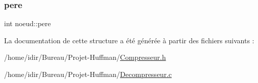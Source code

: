 \mbox{\label{structnoeud_abaa508f22b6e8abe012cd536e7bb8780}} 
\subsubsection{\texorpdfstring{pere}{pere}}
{\footnotesize\ttfamily int noeud\+::pere}



La documentation de cette structure a été générée à partir des fichiers suivants \+:\begin{DoxyCompactItemize}
\item 
/home/idir/\+Bureau/\+Projet-\/\+Huffman/\hyperlink{_compresseur_8h}{Compresseur.\+h}\item 
/home/idir/\+Bureau/\+Projet-\/\+Huffman/\hyperlink{_decompresseur_8c}{Decompresseur.\+c}\end{DoxyCompactItemize}
